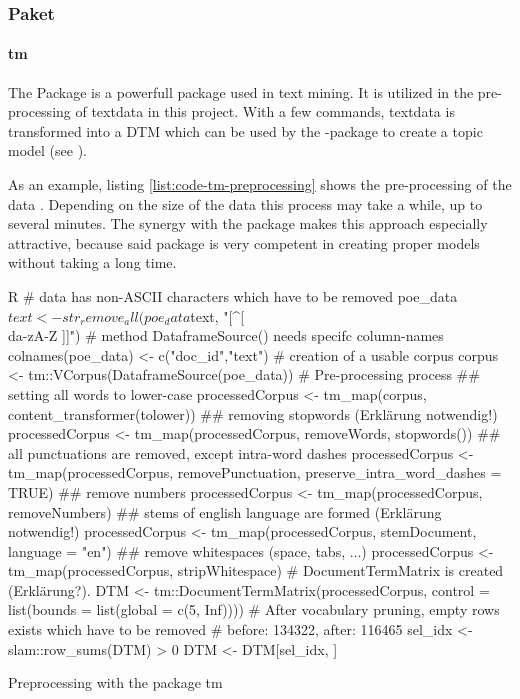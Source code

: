 \newpage

\subsubsection{Paket }\label{sec:preprocessing-packages}

\paragraph{tm} The Package \cite{Feinerer2023-tm} is a powerfull package used in text mining. It is utilized in the pre-processing of textdata in this project. With a few commands, textdata is transformed into a DTM which can be used by the -package to create a topic model (see ).

As an example, listing \ref{list:code-tm-preprocessing} shows the pre-processing of the data . Depending on the size of the data this process may take a while, up to several minutes. The synergy with the package  makes this approach especially attractive, because said package is very competent in creating proper models without taking a long time.

\begin{listing}
\begin{code}{R}
# data has non-ASCII characters which have to be removed
poe_data$text <- str_remove_all(poe_data$text, "[^[\\da-zA-Z ]]")
# method DataframeSource() needs specifc column-names
colnames(poe_data) <- c("doc_id","text")
# creation of a usable corpus
corpus <- tm::VCorpus(DataframeSource(poe_data))
# Pre-processing process
## setting all words to lower-case
processedCorpus <- tm_map(corpus, content_transformer(tolower))
## removing stopwords (Erklärung notwendig!)
processedCorpus <- tm_map(processedCorpus, removeWords, stopwords())
## all punctuations are removed, except intra-word dashes
processedCorpus <- tm_map(processedCorpus, removePunctuation, preserve_intra_word_dashes = TRUE)
## remove numbers
processedCorpus <- tm_map(processedCorpus, removeNumbers)
## stems of english language are formed (Erklärung notwendig!)
processedCorpus <- tm_map(processedCorpus, stemDocument, language = "en")
## remove whitespaces (space, tabs, ...)
processedCorpus <- tm_map(processedCorpus, stripWhitespace)
# DocumentTermMatrix is created (Erklärung?). 
DTM <- tm::DocumentTermMatrix(processedCorpus, control = list(bounds = list(global = c(5, Inf))))
# After vocabulary pruning, empty rows exists which have to be removed
# before: 134322, after: 116465
sel_idx <- slam::row_sums(DTM) > 0
DTM <- DTM[sel_idx, ]
\end{code}  
    \caption{Preprocessing with the package tm}
    \label{list:code-tm-preprocessing}
\end{listing}


